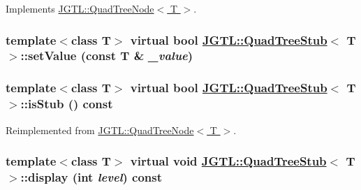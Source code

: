 Implements \hyperlink{class_j_g_t_l_1_1_quad_tree_node_8bf383a824c1b5dc7dc2fff05aeaaec9}{JGTL::Quad\-Tree\-Node$<$ T $>$}.\hypertarget{class_j_g_t_l_1_1_quad_tree_stub_8f3a3fc28ed6b8880b68ad791c1cb931}{
\subsubsection[setValue]{\setlength{\rightskip}{0pt plus 5cm}template$<$class T$>$ virtual bool \hyperlink{class_j_g_t_l_1_1_quad_tree_stub}{JGTL::Quad\-Tree\-Stub}$<$ T $>$::set\-Value (const T \& {\em \_\-value})}}
\label{class_j_g_t_l_1_1_quad_tree_stub_8f3a3fc28ed6b8880b68ad791c1cb931}


\hypertarget{class_j_g_t_l_1_1_quad_tree_stub_69d364f4525bbc32d27ad2a7a2a4502b}{
\subsubsection[isStub]{\setlength{\rightskip}{0pt plus 5cm}template$<$class T$>$ virtual bool \hyperlink{class_j_g_t_l_1_1_quad_tree_stub}{JGTL::Quad\-Tree\-Stub}$<$ T $>$::is\-Stub () const}}
\label{class_j_g_t_l_1_1_quad_tree_stub_69d364f4525bbc32d27ad2a7a2a4502b}




Reimplemented from \hyperlink{class_j_g_t_l_1_1_quad_tree_node_bdc8677d8f2d61e8e7bbe31922b1899f}{JGTL::Quad\-Tree\-Node$<$ T $>$}.\hypertarget{class_j_g_t_l_1_1_quad_tree_stub_d9cc4e6b8fb18dd55043edf3f503c9c7}{
\subsubsection[display]{\setlength{\rightskip}{0pt plus 5cm}template$<$class T$>$ virtual void \hyperlink{class_j_g_t_l_1_1_quad_tree_stub}{JGTL::Quad\-Tree\-Stub}$<$ T $>$::display (int {\em level}) const}}
\label{class_j_g_t_l_1_1_quad_tree_stub_d9cc4e6b8fb18dd55043edf3f503c9c7}




